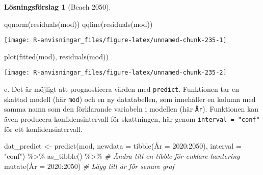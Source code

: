 \documentclass[
]{book}
\newenvironment{Shaded}{\begin{snugshade}}{\end{snugshade}}
\newcommand{\AttributeTok}[1]{\textcolor[rgb]{0.77,0.63,0.00}{#1}}
\newcommand{\CommentTok}[1]{\textcolor[rgb]{0.56,0.35,0.01}{\textit{#1}}}
\newcommand{\DecValTok}[1]{\textcolor[rgb]{0.00,0.00,0.81}{#1}}
\newcommand{\FunctionTok}[1]{\textcolor[rgb]{0.00,0.00,0.00}{#1}}
\newcommand{\NormalTok}[1]{#1}
\newcommand{\OtherTok}[1]{\textcolor[rgb]{0.56,0.35,0.01}{#1}}
\newcommand{\SpecialCharTok}[1]{\textcolor[rgb]{0.00,0.00,0.00}{#1}}
\newcommand{\StringTok}[1]{\textcolor[rgb]{0.31,0.60,0.02}{#1}}
\theoremstyle{definition}
\theoremstyle{definition}
\theoremstyle{definition}
\theoremstyle{definition}
\newtheorem{hypothesis}{Lösningsförslag}[chapter]
\theoremstyle{remark}
\begin{document}
\begin{hypothesis}[Beach 2050]
\begin{Shaded}
\begin{Highlighting}[]
\FunctionTok{qqnorm}\NormalTok{(}\FunctionTok{residuals}\NormalTok{(mod))}
\FunctionTok{qqline}\NormalTok{(}\FunctionTok{residuals}\NormalTok{(mod))}
\end{Highlighting}
\end{Shaded}

\begin{center}\texttt{[image: R-anvisningar\_files/figure-latex/unnamed-chunk-235-1]} \end{center}

\begin{Shaded}
\begin{Highlighting}[]
\FunctionTok{plot}\NormalTok{(}\FunctionTok{fitted}\NormalTok{(mod), }\FunctionTok{residuals}\NormalTok{(mod))}
\end{Highlighting}
\end{Shaded}

\begin{center}\texttt{[image: R-anvisningar\_files/figure-latex/unnamed-chunk-235-2]} \end{center}

c. Det är möjligt att prognosticera värden med \texttt{predict}. Funktionen tar en skattad modell (här \texttt{mod}) och en ny datatabellen, som innehåller en kolumn med samma namn som den förklarande variabeln i modellen (här \texttt{År}). Funktionen kan även producera konfidensintervall för skattningen, här genom \texttt{interval\ =\ "conf"} för ett konfidensintervall.

\begin{Shaded}
\begin{Highlighting}[]
\NormalTok{dat\_predict }\OtherTok{\textless{}{-}} \FunctionTok{predict}\NormalTok{(mod, }\AttributeTok{newdata =} \FunctionTok{tibble}\NormalTok{(Å}\AttributeTok{r =} \DecValTok{2020}\SpecialCharTok{:}\DecValTok{2050}\NormalTok{), }\AttributeTok{interval =} \StringTok{"conf"}\NormalTok{) }\SpecialCharTok{\%\textgreater{}\%} 
  \FunctionTok{as\_tibble}\NormalTok{() }\SpecialCharTok{\%\textgreater{}\%} \CommentTok{\# Ändra till en tibble för enklare hantering}
  \FunctionTok{mutate}\NormalTok{(Å}\AttributeTok{r =} \DecValTok{2020}\SpecialCharTok{:}\DecValTok{2050}\NormalTok{) }\CommentTok{\# Lägg till år för senare graf}


\end{Highlighting}
\end{Shaded}
\end{hypothesis}
\end{document}
